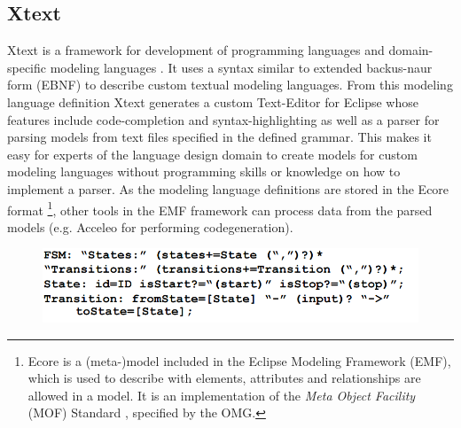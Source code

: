 \documentclass[runningheads,a4paper]{llncs}
\begin{document}
    \subsection{Xtext}
    Xtext is a framework for development of programming languages and domain-specific modeling languages \cite{eysholdt2010xtext}.
    It uses a syntax similar to extended backus-naur form (EBNF) to describe custom textual modeling languages. 
    From this modeling language definition Xtext generates a custom Text-Editor for Eclipse whose features include code-completion and syntax-highlighting
    as well as a parser for parsing models from text files specified in the defined grammar. This makes it easy for experts of the language design
    domain to create models for custom modeling languages without programming skills or knowledge on how to implement a parser.
    As the modeling language definitions are stored in the Ecore format \footnote{Ecore is a (meta-)model included in the Eclipse Modeling Framework (EMF), which is used to describe with elements, attributes and relationships are allowed 
    in a model. It is an implementation of the \emph{Meta Object Facility} (MOF) Standard \cite{mof20062}, specified by the OMG.}, other tools in the EMF framework can process data from the parsed 
    models (e.g. Acceleo\cite{musset2006acceleo} for performing codegeneration).  
    
    \begin{figure}[H]
      \centering
      \label{fig:fsmgrammar}
      \includegraphics[width=\textwidth]{images/XTextGrammar.PNG}
    \end{figure}
   
%    
    
\end{document}
